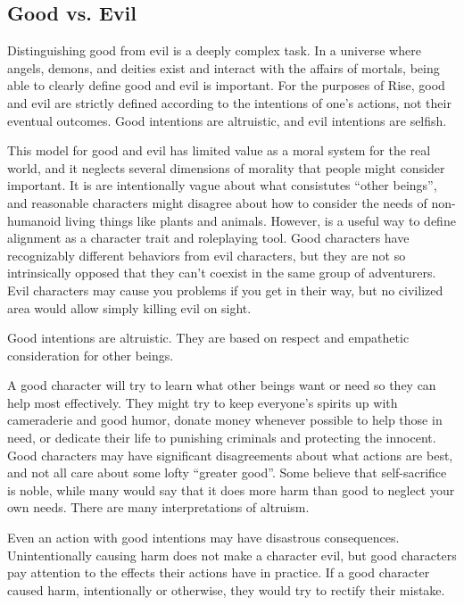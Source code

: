     \subsection{Good vs. Evil}
        Distinguishing good from evil is a deeply complex task.
        In a universe where angels, demons, and deities exist and interact with the affairs of mortals, being able to clearly define good and evil is important.
        For the purposes of Rise, good and evil are strictly defined according to the intentions of one's actions, not their eventual outcomes.
        Good intentions are altruistic, and evil intentions are selfish.

        This model for good and evil has limited value as a moral system for the real world, and it neglects several dimensions of morality that people might consider important.
        It is are intentionally vague about what consistutes ``other beings'', and reasonable characters might disagree about how to consider the needs of non-humanoid living things like plants and animals.
        However, is a useful way to define alignment as a character trait and roleplaying tool.
        Good characters have recognizably different behaviors from evil characters, but they are not so intrinsically opposed that they can't coexist in the same group of adventurers.
        Evil characters may cause you problems if you get in their way, but no civilized area would allow simply killing evil on sight.

         Good intentions are altruistic.
        They are based on respect and empathetic consideration for other beings.

        A good character will try to learn what other beings want or need so they can help most effectively.
        They might try to keep everyone's spirits up with cameraderie and good humor, donate money whenever possible to help those in need, or dedicate their life to punishing criminals and protecting the innocent.
        Good characters may have significant disagreements about what actions are best, and not all care about some lofty ``greater good''.
        Some believe that self-sacrifice is noble, while many would say that it does more harm than good to neglect your own needs.
        There are many interpretations of altruism.

        Even an action with good intentions may have disastrous consequences.
        Unintentionally causing harm does not make a character evil, but good characters pay attention to the effects their actions have in practice.
        If a good character caused harm, intentionally or otherwise, they would try to rectify their mistake.

